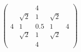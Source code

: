 \begin{equation}
\begin{pmatrix}
& & 4 & & \\
& \sqrt{2} & 1 & \sqrt{2} & \\
4 & 1 & 0.5 & 1 & 4\\
& \sqrt{2} & 1 & \sqrt{2} & \\
& & 4 & & 
\end{pmatrix}
\end{equation}











        

